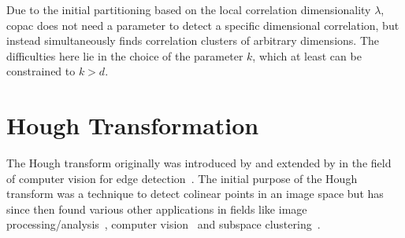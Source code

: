 Due to the initial partitioning based on the local correlation dimensionality $\lambda$, \gls{copac} does not need a parameter to detect a specific dimensional correlation, but instead simultaneously finds correlation clusters of arbitrary dimensions. The difficulties here lie in the choice of the parameter $k$, which at least can be constrained to $k>d$.
\\




\section{Hough Transformation}\label{sec:houghintro}
The Hough transform originally was introduced by \textcite{houghOriginal1962method} and extended by \textcite{rosenfeld1969picture} in the field of computer vision for edge detection~\cite{houghhistoryhart2009hough}. The initial purpose of the Hough transform was a technique to detect colinear points in an image space but has since then found various other applications in fields like image processing/analysis~\cite{rosenfeld1969picture,ballard1981generalizing}, computer vision~\cite{davies2004machine} and subspace clustering~\cite{CASHachtert2008robust}.

